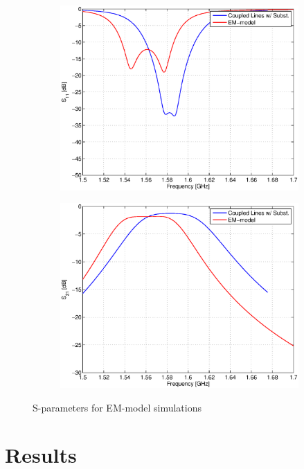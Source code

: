 \documentclass[a4paper]{article}        %
\begin{document}
			\begin{figure}[H]
			\centering
				\begin{subfigure}{0.7\textwidth}
				\includegraphics[width=\textwidth]{fig/Filter/2nd_order/plots/S11_layout.eps}
				\end{subfigure}
				\begin{subfigure}{0.7\textwidth}
				\includegraphics[width=\textwidth]{fig/Filter/2nd_order/plots/S21_layout.eps}
				\end{subfigure}
			\caption{S-parameters for EM-model simulations}
			\label{fig:filter_em_model}
			\end{figure} 
\section{Results}
\end{document}
